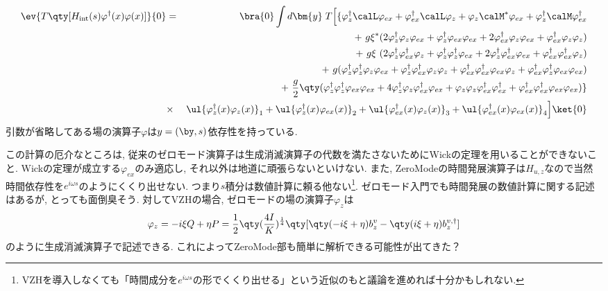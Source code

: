 \documentclass[10.5pt,a4paper]{jreport}
\begin{document}
\begin{eqnarray}
  \nonumber \ev{T\qty[H_{\rm int}(s)\varphi^\dagger(x)\varphi(x)]}{0} &=& \bra{0}\int d\bm{y}\; T\Bigl[\{\varphi_z^\dagger\calL\varphi_{ex} + \varphi_{ex}^\dagger\calL\varphi_z + \varphi_z\calM^*\varphi_{ex} + \varphi_z^\dagger\calM\varphi_{ex}^\dagger\\
    \nonumber  && +\ g\xi^*(2\varphi_z^\dagger\varphi_z\varphi_{ex} + \varphi_z^\dagger\varphi_{ex}\varphi_{ex} + 2\varphi_{ex}^\dagger\varphi_z\varphi_{ex} + \varphi_{ex}^\dagger\varphi_z\varphi_z)\\
    \nonumber  && +\ g\xi\ (2\varphi_z^\dagger\varphi_{ex}^\dagger\varphi_z + \varphi_z^\dagger\varphi_z^\dagger\varphi_{ex} + 2\varphi_z^\dagger\varphi_{ex}^\dagger\varphi_{ex} + \varphi_{ex}^\dagger\varphi_{ex}^\dagger\varphi_z)\\
    \nonumber  && +\ g(\varphi^\dagger_z\varphi^\dagger_z\varphi_z\varphi_{ex} + \varphi^\dagger_z\varphi^\dagger_{ex}\varphi_z\varphi_z + \varphi_{ex}^\dagger\varphi^\dagger_{ex}\varphi_{ex}\varphi_{z} + \varphi^\dagger_{ex}\varphi^\dagger_{z}\varphi_{ex}\varphi_{ex}) \\
    \nonumber  && +\ \frac{g}{2}\qty(\varphi^\dagger_z \varphi^\dagger_z \varphi_{ex}\varphi_{ex} + 4\varphi^\dagger_z \varphi_z \varphi^\dagger_{ex}\varphi_{ex} + \varphi_z \varphi_z \varphi^\dagger_{ex}\varphi^\dagger_{ex} + \varphi_{ex}^\dagger\varphi_{ex}^\dagger\varphi_{ex}\varphi_{ex})\}\\
    \nonumber&\times& \ul{\varphi_{z}^\dagger(x)\varphi_{z}(x)}_1 + \ul{\varphi^\dagger_{z}(x)\varphi_{ex}(x)}_2 + \ul{\varphi^\dagger_{ex}(x)\varphi_{z}(x)}_3 + \ul{\varphi^\dagger_{ex}(x)\varphi_{ex}(x)}_4\Bigr]\ket{0}\\
\end{eqnarray}
引数が省略してある場の演算子$\varphi$は$y = (\by, s)$依存性を持っている. 

この計算の厄介なところは, 従来のゼロモード演算子は生成消滅演算子の代数を満たさないためにWickの定理を用いることができないこと. Wickの定理が成立する$\varphi_{ex}$のみ適応し, それ以外は地道に頑張らないといけない. また, ZeroModeの時間発展演算子は$H_{u, z}$なので当然時間依存性を$e^{i\omega s}$のようにくくり出せない. つまり$s$積分は数値計算に頼る他ない\footnote{VZHを導入しなくても「時間成分を$e^{i\omega s}$の形でくくり出せる」という近似のもと議論を進めれば十分かもしれない. }. ゼロモード入門でも時間発展の数値計算に関する記述はあるが, とっても面倒臭そう. 対してVZHの場合, ゼロモードの場の演算子$\varphi_z$は
\begin{eqnarray}
  \varphi_z = -i\xi Q + \eta P = \frac12 \qty(\frac{4I}{K})^{\frac14}\qty[\qty(-i\xi + \eta)b_z^v - \qty(i\xi + \eta)b_z^{v, \dagger}]
\end{eqnarray}
のように生成消滅演算子で記述できる. これによってZeroMode部も簡単に解析できる可能性が出てきた？
\end{document}
